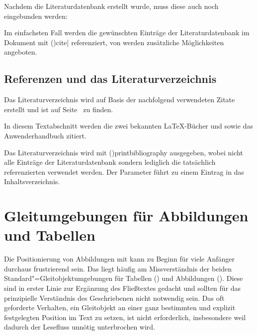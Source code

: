 \documentclass[%
  english,ngerman,%
  cdgeometry=no,DIV=12,%
  cd=false,cdfont=false,cdtitle=true,%
  headings=normal,%
  automark,%
  listof=toc,%
]{tudscrartcl}
\begin{document}
\begingroup%
\makeatletter
\appto\filec@ntents@nosearch{\filec@ntents@force\filec@ntents@silent}
\InputCode
\endgroup
%
Nachdem die Literaturdatenbank erstellt wurde, muss diese auch noch eingebunden 
werden:
%
\begin{Preamble}


\end{Preamble}
%
Im einfachsten Fall werden die gewünschten Einträge der Literaturdatenbank im 
Dokument mit \Macro(){cite|} referenziert, 
von  werden zusätzliche Möglichkeiten angeboten.
%
\begin{refsection}
\begin{Trunk+}
\section{Referenzen und das Literaturverzeichnis}

Das Literaturverzeichnis wird auf Basis der nachfolgend verwendeten 
Zitate erstellt und ist auf Seite~\pageref{sec:bibliography} zu finden.
\end{Trunk+}
\begin{Trunk*}
In diesem Textabschnitt werden die zwei bekannten \LaTeX-Bücher
\cite{knuth84} und \cite{goossens94} sowie das Anwenderhandbuch
\cite{hanisch19} zitiert.

\end{Trunk*}
%
Das Literaturverzeichnis wird mit \Macro(){printbibliography} 
ausgegeben, wobei nicht alle Einträge der Literaturdatenbank sondern lediglich 
die tatsächlich referenzierten verwendet werden. Der Parameter 
 führt zu einem Eintrag in das Inhaltsverzeichnis.
%
\begin{Hint}
\printbibliography[heading=bibintoc]
\end{Hint}
\begin{quoting}[rightmargin=0pt]
\makeatletter
\let\markboth\@gobbletwo
\let\markright\@gobble
\makeatother
\printbibliography
\end{quoting}
\end{refsection}



\section{%
  Gleitumgebungen für Abbildungen und Tabellen%
  \label{sec:floats}%
}

Die Positionierung von Abbildungen mit  kann zu Beginn für 
viele Anfänger durchaus frustrierend sein. Das liegt häufig am Missverständnis 
der beiden Standard"=Gleitobjektumgebungen für Tabellen () 
und Abbildungen (). Diese sind in erster Linie zur 
Ergänzung des Fließtextes gedacht und sollten für das prinzipielle Verständnis 
des Geschriebenen nicht notwendig sein. Das oft geforderte Verhalten, ein 
Gleitobjekt an einer ganz bestimmten und explizit festgelegten Position im Text 
zu setzen, ist nicht erforderlich, insbesondere weil dadurch der Lesefluss 
unnötig unterbrochen wird. 
\end{document}
